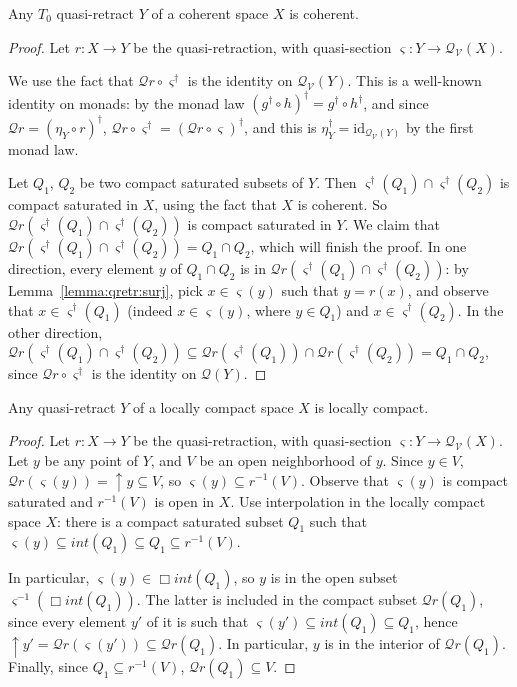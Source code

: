\documentclass{LMCS}
\newcommand\Smyth{\mathcal Q}
\newcommand\V{{\mathcal V}}
\newcommand\SV{\Smyth_\V}
\newcommand\upc{\mathop{\uparrow}\nolimits}
\newcommand{\interior}[1]{int ({#1})} \newcommand{\biginterior}[1]{\interior{#1}}
\newcommand{\identity}[1]{\mathrm{id}_{#1}}
\newcommand\qs{\varsigma}
\begin{document}
\begin{lem}
  \label{lemma:qretr:coh}
  Any $T_0$ quasi-retract $Y$ of a coherent space $X$ is coherent.
\end{lem}
\begin{proof}
  Let $r : X \to Y$ be the quasi-retraction, with quasi-section $\qs :
  Y \to \SV (X)$.

  We use the fact that $\Smyth r \circ \qs^\dagger$ is the identity on
  $\SV (Y)$.  This is a well-known identity on monads: by the monad
  law $(g^\dagger \circ h)^\dagger = g^\dagger \circ h^\dagger$, and
  since $\Smyth r = (\eta_Y \circ r)^\dagger$, $\Smyth r \circ
  \qs^\dagger = (\Smyth r \circ \qs)^\dagger$, and this is
  $\eta_Y^\dagger = \identity {\SV (Y)}$ by the first monad law.

  Let $Q_1$, $Q_2$ be two compact saturated subsets of $Y$.  Then
  $\qs^\dagger (Q_1) \cap \qs^\dagger (Q_2)$ is compact saturated in
  $X$, using the fact that $X$ is coherent.  So $\Smyth r (\qs^\dagger
  (Q_1) \cap \qs^\dagger (Q_2))$ is compact saturated in $Y$.  We
  claim that $\Smyth r (\qs^\dagger (Q_1) \cap \qs^\dagger (Q_2)) =
  Q_1 \cap Q_2$, which will finish the proof.  In one direction, every
  element $y$ of $Q_1 \cap Q_2$ is in $\Smyth r (\qs^\dagger (Q_1)
  \cap \qs^\dagger (Q_2))$: by Lemma~\ref{lemma:qretr:surj}, pick $x
  \in \qs (y)$ such that $y = r (x)$, and observe that $x \in
  \qs^\dagger (Q_1)$ (indeed $x \in \qs (y)$, where $y \in Q_1$) and
  $x \in \qs^\dagger (Q_2)$.  In the other direction, $\Smyth r
  (\qs^\dagger (Q_1) \cap \qs^\dagger (Q_2)) \subseteq \Smyth r
  (\qs^\dagger (Q_1)) \cap \Smyth r (\qs^\dagger (Q_2)) = Q_1 \cap
  Q_2$, since $\Smyth r \circ \qs^\dagger$ is the identity on $\Smyth
  (Y)$.
\end{proof}

\begin{lem}
  \label{lemma:qretr:lcomp}
  Any quasi-retract $Y$ of a locally compact space $X$ is locally
  compact.
\end{lem}
\begin{proof}
  Let $r : X \to Y$ be the quasi-retraction, with quasi-section $\qs :
  Y \to \SV (X)$.  Let $y$ be any point of $Y$, and $V$ be an open
  neighborhood of $y$.  Since $y \in V$, $\Smyth r (\qs (y)) = \upc y
  \subseteq V$, so $\qs (y) \subseteq r^{-1} (V)$.  Observe that $\qs
  (y)$ is compact saturated and $r^{-1} (V)$ is open in $X$.  Use
  interpolation in the locally compact space $X$: there is a compact
  saturated subset $Q_1$ such that $\qs (y) \subseteq \interior {Q_1}
  \subseteq Q_1 \subseteq r^{-1} (V)$.

  In particular, $\qs (y) \in \Box \interior {Q_1}$, so $y$ is in the
  open subset $\qs^{-1} (\Box \interior {Q_1})$.  The latter is
  included in the compact subset $\Smyth r (Q_1)$, since every element
  $y'$ of it is such that $\qs (y') \subseteq \interior {Q_1}
  \subseteq Q_1$, hence $\upc y' = \Smyth r (\qs (y')) \subseteq
  \Smyth r (Q_1)$.  In particular, $y$ is in the interior of $\Smyth r
  (Q_1)$.  Finally, since $Q_1 \subseteq r^{-1} (V)$, $\Smyth r (Q_1)
  \subseteq V$.
\end{proof}
\end{document}
